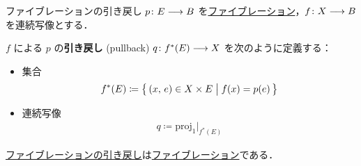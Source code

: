 \documentclass[algtopo_main]{subfiles}
\begin{document}
\begin{mydef}[label=def:fib-pullback]{ファイブレーションの引き戻し}
    $p \colon E \longrightarrow B$ を\hyperref[def:fibration]{ファイブレーション}，$f \colon X \longrightarrow B$ を連続写像とする．

    $f$ による $p$ の\textbf{引き戻し} (pullback) $q \colon f^*(E) \longrightarrow X$ を次のように定義する：
    \begin{itemize}
        \item 集合
        \begin{align}
            f^* (E) \coloneqq \bigl\{\, (x,\, e) \in X \times E \bigm| f(x) = p(e) \,\bigr\} 
        \end{align}
        \item 連続写像
        \begin{align}
            q \coloneqq \mathrm{proj}_1|_{f^*(E)}
        \end{align}
    \end{itemize}
\end{mydef}

\begin{myprop}[label=prop:fib-pullback]{}
    \hyperref[def:fib-pullback]{ファイブレーションの引き戻し}は\hyperref[def:fibration]{ファイブレーション}である．
\end{myprop}
\end{document}
